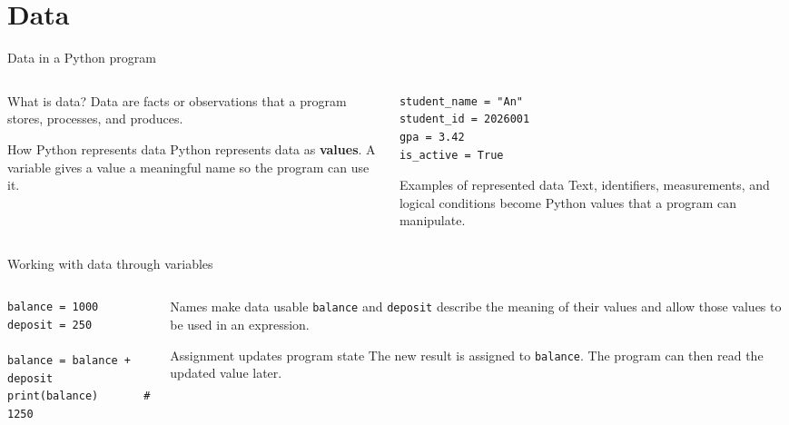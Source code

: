 \documentclass[aspectratio=169]{beamer}
\begin{document}
\section{Data}

\begin{frame}[fragile]{Data in a Python program}
  \begin{columns}[T]
    \begin{column}{0.46\textwidth}
      \begin{block}{What is data?}
        Data are facts or observations that a program stores, processes, and
        produces.
      \end{block}

      \begin{exampleblock}{How Python represents data}
        Python represents data as \textbf{values}. A variable gives a value a
        meaningful name so the program can use it.
      \end{exampleblock}
    \end{column}
    \begin{column}{0.50\textwidth}
\begin{lstlisting}
student_name = "An"
student_id = 2026001
gpa = 3.42
is_active = True
\end{lstlisting}

      \begin{alertblock}{Examples of represented data}
        Text, identifiers, measurements, and logical conditions become Python
        values that a program can manipulate.
      \end{alertblock}
    \end{column}
  \end{columns}
\end{frame}

\begin{frame}[fragile]{Working with data through variables}
  \begin{columns}[T]
    \begin{column}{0.47\textwidth}
\begin{lstlisting}
balance = 1000
deposit = 250

balance = balance + deposit
print(balance)       # 1250
\end{lstlisting}
    \end{column}
    \begin{column}{0.49\textwidth}
      \begin{block}{Names make data usable}
        \texttt{balance} and \texttt{deposit} describe the meaning of their
        values and allow those values to be used in an expression.
      \end{block}

      \begin{exampleblock}{Assignment updates program state}
        The new result is assigned to \texttt{balance}. The program can then
        read the updated value later.
      \end{exampleblock}
    \end{column}
  \end{columns}
\end{frame}
\end{document}
